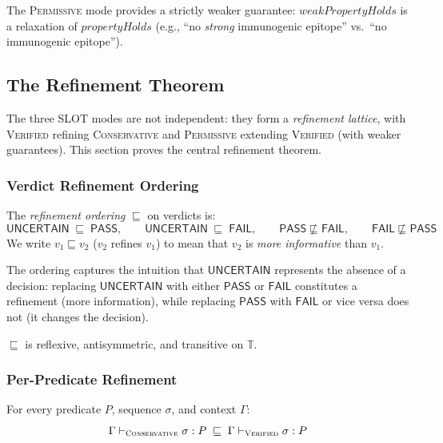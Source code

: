 \documentclass[acmsmall,review,anonymous]{acmart}
\newcommand{\PASS}{\ensuremath{\mathsf{PASS}}\xspace}
\newcommand{\FAIL}{\ensuremath{\mathsf{FAIL}}\xspace}
\newcommand{\UNCERTAIN}{\ensuremath{\mathsf{UNCERTAIN}}\xspace}
\newcommand{\tvl}{\mathbb{T}}
\newcommand{\seq}{\sigma}
\newcommand{\pred}{P}
\newcommand{\verdict}{v}
\newcommand{\CONSERVATIVE}{\textsc{Conservative}\xspace}
\newcommand{\VERIFIED}{\textsc{Verified}\xspace}
\newcommand{\PERMISSIVE}{\textsc{Permissive}\xspace}
\newcommand{\evalmode}[4]{#1 \vdash_{#2} #3 : #4}
\begin{document}
The \PERMISSIVE{} mode provides a strictly weaker guarantee:
$\mathit{weakPropertyHolds}$ is a relaxation of
$\mathit{propertyHolds}$ (e.g., ``no \emph{strong} immunogenic
epitope'' vs.\ ``no immunogenic epitope'').

\subsection{The Refinement Theorem}\label{sec:refinement}

The three SLOT modes are not independent: they form a \emph{refinement
lattice}, with \VERIFIED{} refining \CONSERVATIVE{} and \PERMISSIVE{}
extending \VERIFIED{} (with weaker guarantees).
This section proves the central refinement theorem.

\subsubsection{Verdict Refinement Ordering}

\begin{definition}
The \emph{refinement ordering} $\sqsubseteq$ on verdicts is:
\[
  \UNCERTAIN \;\sqsubseteq\; \PASS,
  \qquad
  \UNCERTAIN \;\sqsubseteq\; \FAIL,
  \qquad
  \PASS \not\sqsubseteq \FAIL,
  \qquad
  \FAIL \not\sqsubseteq \PASS
\]
We write $\verdict_1 \sqsubseteq \verdict_2$ ($\verdict_2$ refines
$\verdict_1$) to mean that $\verdict_2$ is \emph{more informative}
than $\verdict_1$.
\end{definition}

The ordering captures the intuition that \UNCERTAIN{} represents the
absence of a decision: replacing \UNCERTAIN{} with either \PASS{} or
\FAIL{} constitutes a refinement (more information), while replacing
\PASS{} with \FAIL{} or vice versa does not (it changes the decision).

\begin{lemma}\label{lem:po}
$\sqsubseteq$ is reflexive, antisymmetric, and transitive on $\tvl$.
\end{lemma}

\subsubsection{Per-Predicate Refinement}

\begin{theorem}\label{thm:pred-refine}
For every predicate $\pred$, sequence $\seq$, and context $\Gamma$:
\[
  \evalmode{\Gamma}{\CONSERVATIVE}{\seq}{\pred}
  \;\sqsubseteq\;
  \evalmode{\Gamma}{\VERIFIED}{\seq}{\pred}
\]
\end{theorem}
\end{document}
